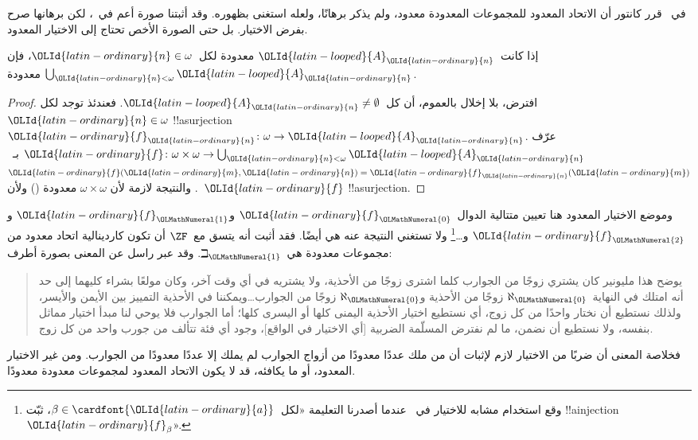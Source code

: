 \documentclass[../../../include/open-logic-section]{subfiles}
\begin{document}
\begin{ex}
في~\citeyear{Cantor1878} قرر كانتور أن الاتحاد المعدود للمجموعات
المعدودة معدود، ولم يذكر برهانًا، ولعله استغنى بظهوره. وقد أثبتنا صورة
أعم في~، لكن برهانها
صرح بفرض الاختيار. بل حتى الصورة الأخص تحتاج إلى الاختيار المعدود.

\begin{thm}
إذا كانت~${\OLId{latin-looped}{A}}_{\OLId{latin-ordinary}{n}}$ معدودة لكل~${\OLId{latin-ordinary}{n}} \in \omega$، فإن
$\bigcup_{{\OLId{latin-ordinary}{n}} < \omega} {\OLId{latin-looped}{A}}_{\OLId{latin-ordinary}{n}}$ معدودة.
\end{thm}

\begin{proof}
افترض، بلا إخلال بالعموم، أن كل~${\OLId{latin-looped}{A}}_{\OLId{latin-ordinary}{n}} \neq \emptyset$. فعندئذ توجد
لكل~${\OLId{latin-ordinary}{n}} \in \omega$ !!a{surjection}
${\OLId{latin-ordinary}{f}}_{\OLId{latin-ordinary}{n}} \colon \omega \to {\OLId{latin-looped}{A}}_{\OLId{latin-ordinary}{n}}$. عرّف
${\OLId{latin-ordinary}{f}} \colon \omega \times \omega \to \bigcup_{{\OLId{latin-ordinary}{n}} < \omega} {\OLId{latin-looped}{A}}_{\OLId{latin-ordinary}{n}}$
بـ~${\OLId{latin-ordinary}{f}}({\OLId{latin-ordinary}{m}}, {\OLId{latin-ordinary}{n}}) = {\OLId{latin-ordinary}{f}}_{\OLId{latin-ordinary}{n}}({\OLId{latin-ordinary}{m}})$. والنتيجة لازمة لأن
$\omega \times \omega$ معدودة
() ولأن~${\OLId{latin-ordinary}{f}}$
!!a{surjection}.
\end{proof}
\noindent
وموضع الاختيار المعدود هنا تعيين متتالية الدوال~${\OLId{latin-ordinary}{f}}_{\OLMathNumeral{0}}$ و${\OLId{latin-ordinary}{f}}_{\OLMathNumeral{1}}$ و${\OLId{latin-ordinary}{f}}_{\OLMathNumeral{2}}$
و\dots\footnote{وقع استخدام مشابه
للاختيار في~ عندما
أصدرنا التعليمة «لكل~$\beta \in \cardfont{{\OLId{latin-ordinary}{a}}}$، ثبّت
!!a{injection}~${\OLId{latin-ordinary}{f}}_\beta$».} ولا تستغني النتيجة عنه هي أيضًا. فقد أثبت
\citet{FefermanLevy1963} أنه يتسق مع~$\ZF$ أن تكون كاردينالية اتحاد
معدود من مجموعات معدودة هي~$\beth_{\OLMathNumeral{1}}$. وقد عبر راسل عن المعنى بصورة
أطرف:
\begin{quote}
  يوضح هذا مليونير كان يشتري زوجًا من الجوارب كلما اشترى زوجًا من
  الأحذية، ولا يشتريه في أي وقت آخر، وكان مولعًا بشراء كليهما إلى حد
  أنه امتلك في النهاية~$\aleph_{\OLMathNumeral{0}}$ زوجًا من الأحذية و$\aleph_{\OLMathNumeral{0}}$ زوجًا
  من الجوارب\dots\@ ويمكننا في الأحذية التمييز بين الأيمن والأيسر،
  ولذلك نستطيع أن نختار واحدًا من كل زوج، أي نستطيع اختيار الأحذية
  اليمنى كلها أو اليسرى كلها؛ أما الجوارب فلا يوحي لنا مبدأ اختيار
  مماثل بنفسه، ولا نستطيع أن نضمن، ما لم نفترض المسلّمة الضربية [أي
  الاختيار في الواقع]، وجود أي فئة تتألف من جورب واحد من كل زوج.
  \citep[p.~126]{Russell1919}
\end{quote}
فخلاصة المعنى أن ضربًا من الاختيار لازم لإثبات أن من ملك عددًا معدودًا
من أزواج الجوارب لم يملك إلا عددًا معدودًا من الجوارب. ومن غير
الاختيار المعدود، أو ما يكافئه، قد لا يكون الاتحاد المعدود لمجموعات
معدودة معدودًا.
\end{ex}
\end{document}
